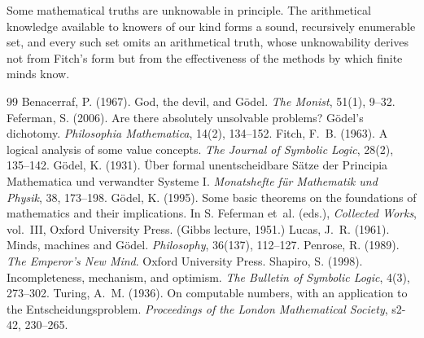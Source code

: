 \documentclass{situationist-preprint}
\begin{document}
Some mathematical truths are unknowable in principle. The arithmetical knowledge available to knowers of our kind forms a sound, recursively enumerable set, and every such set omits an arithmetical truth, whose unknowability derives not from Fitch's form but from the effectiveness of the methods by which finite minds know.

\begin{thebibliography}{99}\small
{} Benacerraf, P. (1967). God, the devil, and Gödel. \emph{The Monist}, 51(1), 9--32.
 Feferman, S. (2006). Are there absolutely unsolvable problems? Gödel's dichotomy. \emph{Philosophia Mathematica}, 14(2), 134--152.
 Fitch, F.~B. (1963). A logical analysis of some value concepts. \emph{The Journal of Symbolic Logic}, 28(2), 135--142.
 G{\"o}del, K. (1931). {\"U}ber formal unentscheidbare S{\"a}tze der Principia Mathematica und verwandter Systeme I. \emph{Monatshefte f{\"u}r Mathematik und Physik}, 38, 173--198.
 G{\"o}del, K. (1995). Some basic theorems on the foundations of mathematics and their implications. In S. Feferman et~al. (eds.), \emph{Collected Works}, vol.~III, Oxford University Press. (Gibbs lecture, 1951.)
 Lucas, J.~R. (1961). Minds, machines and Gödel. \emph{Philosophy}, 36(137), 112--127.
 Penrose, R. (1989). \emph{The Emperor's New Mind}. Oxford University Press.
 Shapiro, S. (1998). Incompleteness, mechanism, and optimism. \emph{The Bulletin of Symbolic Logic}, 4(3), 273--302.
 Turing, A.~M. (1936). On computable numbers, with an application to the Entscheidungsproblem. \emph{Proceedings of the London Mathematical Society}, s2-42, 230--265.
\end{thebibliography}
\end{document}
